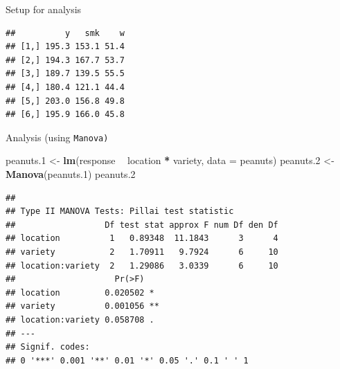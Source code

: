 \documentclass[ignorenonframetext,]{beamer}
\newenvironment{Shaded}{\begin{snugshade}}{\end{snugshade}}
\newcommand{\DataTypeTok}[1]{\textcolor[rgb]{0.13,0.29,0.53}{#1}}
\newcommand{\FloatTok}[1]{\textcolor[rgb]{0.00,0.00,0.81}{#1}}
\newcommand{\KeywordTok}[1]{\textcolor[rgb]{0.13,0.29,0.53}{\textbf{#1}}}
\newcommand{\NormalTok}[1]{#1}
\newcommand{\OperatorTok}[1]{\textcolor[rgb]{0.81,0.36,0.00}{\textbf{#1}}}
\newcommand{\StringTok}[1]{\textcolor[rgb]{0.31,0.60,0.02}{#1}}
\begin{document}
\begin{frame}[fragile]{Setup for analysis}
\protect\hypertarget{setup-for-analysis}{}

\begin{Shaded}
\end{Shaded}

\begin{verbatim}
##          y   smk    w
## [1,] 195.3 153.1 51.4
## [2,] 194.3 167.7 53.7
## [3,] 189.7 139.5 55.5
## [4,] 180.4 121.1 44.4
## [5,] 203.0 156.8 49.8
## [6,] 195.9 166.0 45.8
\end{verbatim}

\end{frame}

\begin{frame}[fragile]{Analysis (using \texttt{Manova)}}
\protect\hypertarget{analysis-using-manova}{}

\small

\begin{Shaded}
\begin{Highlighting}[]
\NormalTok{peanuts}\FloatTok{.1}\NormalTok{ <-}\StringTok{ }\KeywordTok{lm}\NormalTok{(response }\OperatorTok{~}\StringTok{ }\NormalTok{location }\OperatorTok{*}\StringTok{ }\NormalTok{variety, }\DataTypeTok{data =}\NormalTok{ peanuts)}
\NormalTok{peanuts}\FloatTok{.2}\NormalTok{ <-}\StringTok{ }\KeywordTok{Manova}\NormalTok{(peanuts}\FloatTok{.1}\NormalTok{)}
\NormalTok{peanuts}\FloatTok{.2}
\end{Highlighting}
\end{Shaded}

\begin{verbatim}
## 
## Type II MANOVA Tests: Pillai test statistic
##                  Df test stat approx F num Df den Df
## location          1   0.89348  11.1843      3      4
## variety           2   1.70911   9.7924      6     10
## location:variety  2   1.29086   3.0339      6     10
##                    Pr(>F)   
## location         0.020502 * 
## variety          0.001056 **
## location:variety 0.058708 . 
## ---
## Signif. codes:  
## 0 '***' 0.001 '**' 0.01 '*' 0.05 '.' 0.1 ' ' 1
\end{verbatim}

\normalsize

\end{frame}
\end{document}
